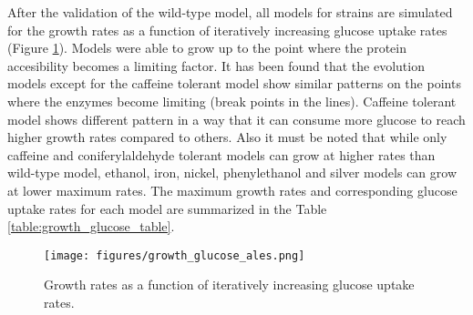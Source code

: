 After the validation of the wild-type model, all models for strains are simulated for the growth rates as a function of iteratively increasing glucose uptake rates (Figure \ref{fig:growth_glucose_ales}). Models were able to grow up to the point where the protein accesibility becomes a limiting factor. It has been found that the evolution models except for the caffeine tolerant model show similar patterns on the points where the enzymes become limiting (break points in the lines). Caffeine tolerant model shows different pattern in a way that it can consume more glucose to reach higher growth rates compared to others. Also it must be noted that while only caffeine and coniferylaldehyde tolerant models can grow at higher rates than wild-type model, ethanol, iron, nickel, phenylethanol and silver models can grow at lower maximum rates. The maximum growth rates and corresponding glucose uptake rates for each model are summarized in the Table \ref{table:growth_glucose_table}.

\begin{figure}[H]
  \begin{center}
  \texttt{[image: figures/growth\_glucose\_ales.png]}
  \caption[Growth rates as a function of iteratively increasing glucose uptake rates]{Growth rates as a function of iteratively increasing glucose uptake rates.}
  \end{center}
  \label{fig:growth_glucose_ales}
  \end{figure}
\vspace{-1.0cm}




